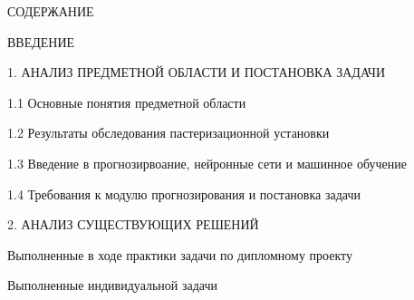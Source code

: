 {\gostTitleFont
    \redline
    СОДЕРЖАНИЕ
} 

\subtitlespace

{\gostFont

    \par ВВЕДЕНИЕ  
    \par 1. АНАЛИЗ ПРЕДМЕТНОЙ ОБЛАСТИ И ПОСТАНОВКА ЗАДАЧИ  
    \par 1.1 Основные понятия предметной области 
    \par 1.2 Результаты обследования пастеризационной установки  
    \par 1.3 Введение в прогнозирвоание, нейронные сети и машинное обучение  
    \par 1.4 Требования к модулю прогнозирования и постановка задачи  
    \par 2. АНАЛИЗ СУЩЕСТВУЮЩИХ РЕШЕНИЙ  
    \par Выполненные в ходе практики задачи по дипломному проекту  
    \par Выполненные индивидуальной задачи  
    \par 
}